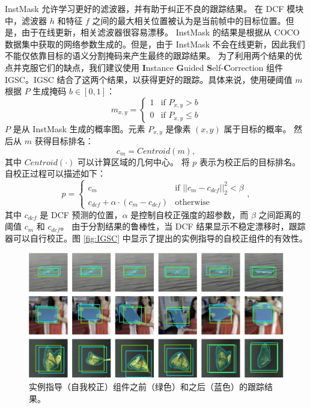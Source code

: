 InstMask 允许学习更好的滤波器，并有助于纠正不良的跟踪结果。
在 DCF 模块中，滤波器 $h$ 和特征 $f$ 之间的最大相关位置被认为是当前帧中的目标位置。但是，由于在线更新，相关滤波器很容易漂移。
InstMask 的结果是根据从 COCO 数据集中获取的网络参数生成的。但是，由于 InstMask 不会在线更新，因此我们不能仅依靠目标的语义分割掩码来产生最终的跟踪结果。
为了利用两个结果的优点并克服它们的缺点，我们建议使用 \textbf{I}nstance \textbf{G}uided \textbf{S}elf-\textbf{C}orrection 组件 IGSC。IGSC 结合了这两个结果，以获得更好的跟踪。具体来说，使用硬阈值 $m$ 根据 $P$ 生成掩码 $b \in [0, 1] $：
\begin{equation}
m_{x,y} = \left\{ \begin{array}{ll}
 1 & \textrm{if $P_{x,y} > b$}\\
 0 & \textrm{if $P_{x,y} \le b$}
 \end{array} \right.
\end{equation}
$P$ 是从 InstMask 生成的概率图。元素 $P_{x,y}$ 是像素 $(x,y)$ 属于目标的概率。
然后从 $m$ 获得目标排名：
\begin{equation}
c_{m} = Centroid(m),
\end{equation}
其中 $Centroid(\mathord{\cdot})$ 可以计算区域的几何中心。
将 $p$ 表示为校正后的目标排名。
自校正过程可以描述如下：
\begin{equation}
p = \left\{ \begin{array}{ll}
 c_{m} & \textrm{if $||c_{m}-c_{dcf}||_2^2 < \beta$}\\
 c_{dcf} + \alpha \cdot (c_{m}-c_{dcf}) & \textrm{otherwise}
 \end{array} \right.,
\end{equation}
其中 $c_{dcf}$ 是 DCF 预测的位置，$\alpha$ 是控制自校正强度的超参数，而 $\beta$ 之间距离的阈值 $c_{m}$ 和 $c_{dcf}$。
由于分割结果的鲁棒性，当 DCF 结果显示不稳定漂移时，跟踪器可以自行校正。图 \ref{fig:IGSC} 中显示了提出的实例指导的自校正组件的有效性。

\begin{figure}
\centering
\includegraphics[width=1.0\textwidth]{Img/IGCF/cog.pdf}
\caption{实例指导（自我校正）组件之前（绿色）和之后（蓝色）的跟踪结果。}
\end{figure}

